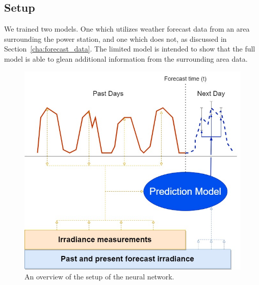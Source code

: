 
    \subsection{Setup}
    We trained two models. One which utilizes weather forecast data from an area surrounding the power station, and one which does not, as discussed in Section~\ref{cha:forecast_data}. The limited model is intended to show that the full model is able to glean additional information from the surrounding area data.
    
    
    
    \begin{figure}[ht!]
        \centering
        \includegraphics[scale=0.6]{imgs/solar_TFT_overview.jpg}
        \caption{An overview of the setup of the neural network.
        \label{fig:solar_tft_overviwew}}
    \end{figure}


